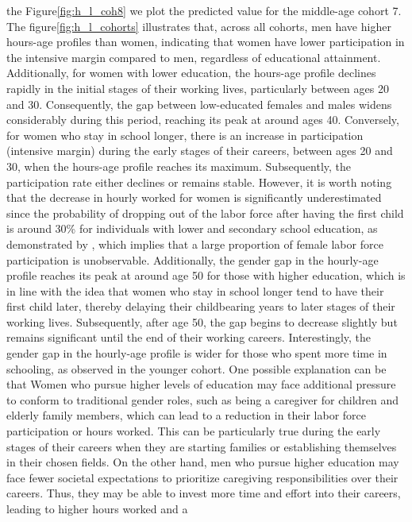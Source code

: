 \documentclass[12pt]{article}
\begin{document}
the Figure\ref{fig:h_l_coh8} we plot the predicted value for the middle-age cohort 7. 
\newline
The figure\ref{fig:h_l_cohorts} illustrates that, across all cohorts, men have higher hours-age profiles than women,
indicating that women have lower participation in the intensive margin compared to men, regardless of educational
attainment. Additionally, for women with lower education, the hours-age profile declines rapidly in the initial stages
of their working lives, particularly between ages 20 and 30. Consequently, the gap between low-educated females and
males widens considerably during this period, reaching its peak at around ages 40. Conversely, for women who stay
in school longer, there is an increase in participation (intensive margin) during the early stages of their careers,
between ages 20 and 30, when the hours-age profile reaches its maximum. Subsequently, the participation rate either
declines or remains stable. However, it is worth noting that the decrease in hourly worked for women is significantly
underestimated since the probability of dropping out of the labor force after having the first child is around 30\% for
individuals with lower and secondary school education, as demonstrated by \citet{Bratti2005}, which implies that a large
proportion of female labor force participation is unobservable.
\newline
Additionally, the gender gap in the hourly-age profile reaches its peak at around age 50 for those with higher
education, which is in line with the idea that women who stay in school longer tend to have their first child later,
thereby delaying their childbearing years to later stages of their working lives. Subsequently, after age 50, the gap
begins to decrease slightly but remains significant until the end of their working careers. Interestingly, the gender
gap in the hourly-age profile is wider for those who spent more time in schooling, as observed in the younger cohort.
 One possible explanation can be that Women who pursue higher levels of education may face additional pressure to conform to
traditional gender roles, such as being a caregiver for children and elderly family members, which can lead to a
reduction in their labor force participation or hours worked. This can be particularly true during the early stages of
their careers when they are starting families or establishing themselves in their chosen fields. On the other hand, men
who pursue higher education may face fewer societal expectations to prioritize caregiving responsibilities over their
careers. Thus, they may be able to invest more time and effort into their careers, leading to higher hours worked and a
\end{document}
